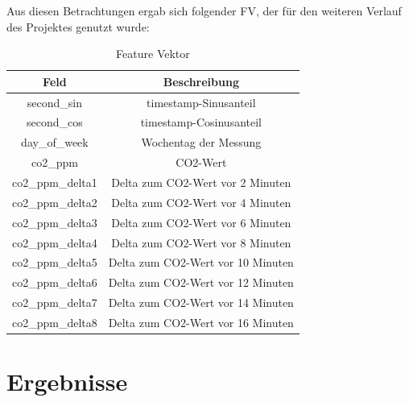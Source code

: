 \newpage
Aus diesen Betrachtungen ergab sich folgender FV, der für den weiteren Verlauf des Projektes genutzt wurde:\\

\begin{center}
    \begin{table}[h]
        \centering
        \caption{Feature Vektor}
        \begin{tabular}{ |c||c| } 
        \hline
        Feld & Beschreibung \\ 
        \hline\hline
        second\_sin & timestamp-Sinusanteil\\
        second\_cos & timestamp-Cosinusanteil\\
        day\_of\_week & Wochentag der Messung\\
        co2\_ppm & CO2-Wert\\ 
        co2\_ppm\_delta1 & Delta zum CO2-Wert vor 2 Minuten\\ 
        co2\_ppm\_delta2 & Delta zum CO2-Wert vor 4 Minuten\\ 
        co2\_ppm\_delta3 & Delta zum CO2-Wert vor 6 Minuten\\ 
        co2\_ppm\_delta4 & Delta zum CO2-Wert vor 8 Minuten\\ 
        co2\_ppm\_delta5 & Delta zum CO2-Wert vor 10 Minuten\\ 
        co2\_ppm\_delta6 & Delta zum CO2-Wert vor 12 Minuten\\ 
        co2\_ppm\_delta7 & Delta zum CO2-Wert vor 14 Minuten\\ 
        co2\_ppm\_delta8 & Delta zum CO2-Wert vor 16 Minuten\\ 
        \hline
        \end{tabular}
    \end{table}
\end{center}

\newpage

\section{Ergebnisse}

